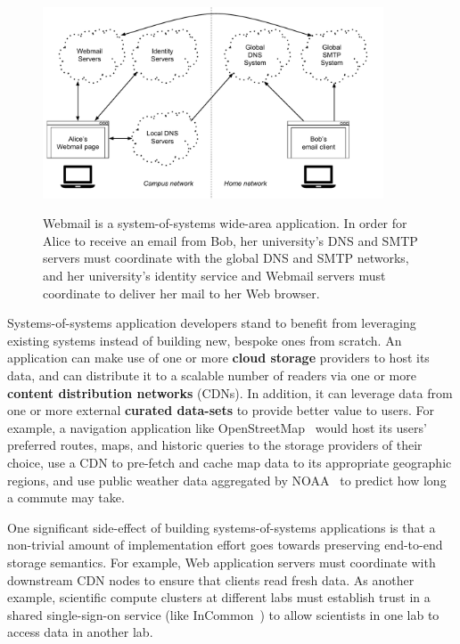 \begin{figure}[h]
   \caption{Webmail is a system-of-systems wide-area application.  In order for
   Alice to receive an email from Bob, her university's DNS and SMTP servers
   must coordinate with the global DNS and SMTP networks, and her university's
   identity service and Webmail servers must coordinate to deliver her mail to
   her Web browser.}
   \centering
   \includegraphics[width=0.9\textwidth,page=1]{figures/dissertation-figures}
   \label{fig:chap1-system-of-systems}
\end{figure}

Systems-of-systems application developers stand to benefit
from leveraging existing systems instead of building new, bespoke ones from
scratch.  An application can make use of one or more \textbf{cloud storage}
providers to host its data, and can distribute it to a scalable number of readers via one or more \textbf{content
distribution networks} (CDNs).  In addition, it can leverage data from
one or more external \textbf{curated data-sets} to provide better value to users.
For example, a navigation application like OpenStreetMap~\cite{openstreetmap} would host its users'
preferred routes, maps, and historic queries to the storage providers of their choice,
use a CDN to pre-fetch and cache map data to its appropriate geographic regions,
and use public weather data aggregated by NOAA~\cite{noaa} to predict how long a commute may take.

One significant side-effect of building systems-of-systems applications
is that a non-trivial amount of implementation effort goes towards
preserving end-to-end storage semantics.  For example, Web
application servers must coordinate with downstream CDN nodes to ensure that
clients read fresh data.  As another example, scientific compute clusters at
different labs must establish trust in a shared single-sign-on service (like
InCommon~\cite{incommon}) to allow scientists in one lab to access data in
another lab.

